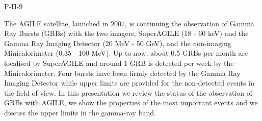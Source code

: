 P-II-9


\bigskip



\bigskip

\noindent The AGILE satellite, launched in 2007, is continuing the observation of Gamma Ray Bursts (GRBs) with the two imagers,
SuperAGILE (18 - 60 keV) and the Gamma Ray Imaging Detector (20 MeV - 50 GeV), and the non-imaging Minicalorimeter (0.35 - 100 MeV). Up to now, about 0.5 GRBs per month are localised by SuperAGILE and around 1 GRB is detected per week by the Minicalorimeter. Four
bursts have been firmly detected by the Gamma Ray Imaging Detector while upper limits are provided for the non-detected events in the field of view. In this presentation we review the status of the observation of GRBs with AGILE, we show the properties of the most important events and we discuss the upper limits in the gamma-ray
band.
